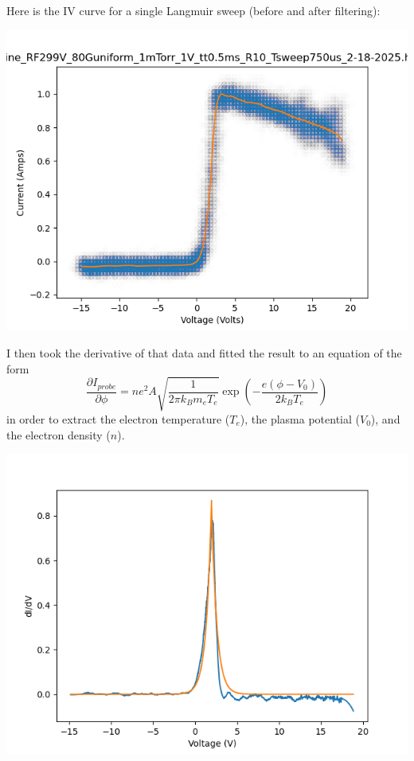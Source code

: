 \documentclass{article}
\begin{document}
\bigskip
\par
\begin{prob}
\end{prob}
Here is the IV curve for a single Langmuir sweep (before and after filtering):
\begin{center}
    \includegraphics[width=\textwidth]{Figure_1.png}
\end{center}
I then took the derivative of that data and fitted the result to an equation of the form
\[ \frac{\partial I_{probe}}{\partial \phi} = n e^2 A \sqrt{ \frac{1}{2 \pi k_B m_e T_e}} \exp \left( - \frac{e (\phi-V_0)}{2 k_B T_e} \right) \]
in order to extract the electron temperature ($T_e$), the plasma potential ($V_0$), and the electron density ($n$).
\begin{center}
    \includegraphics[width=\textwidth]{Figure_2.png}
\end{center}
\end{document}
